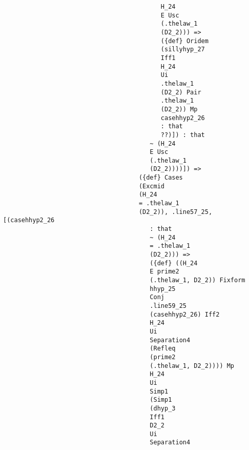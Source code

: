 \documentclass[12pt]{article}
\begin{document}
\begin{verbatim}
                                           H_24 
                                           E Usc 
                                           (.thelaw_1 
                                           (D2_2))) => 
                                           ({def} Oridem 
                                           (sillyhyp_27 
                                           Iff1 
                                           H_24 
                                           Ui 
                                           .thelaw_1 
                                           (D2_2) Pair 
                                           .thelaw_1 
                                           (D2_2)) Mp 
                                           casehhyp2_26 
                                           : that 
                                           ??)]) : that 
                                        ~ (H_24 
                                        E Usc 
                                        (.thelaw_1 
                                        (D2_2))))]) => 
                                     ({def} Cases 
                                     (Excmid 
                                     (H_24 
                                     = .thelaw_1 
                                     (D2_2)), .line57_25, [(casehhyp2_26 
                                        : that 
                                        ~ (H_24 
                                        = .thelaw_1 
                                        (D2_2))) => 
                                        ({def} ((H_24 
                                        E prime2 
                                        (.thelaw_1, D2_2)) Fixform 
                                        hhyp_25 
                                        Conj 
                                        .line59_25 
                                        (casehhyp2_26) Iff2 
                                        H_24 
                                        Ui 
                                        Separation4 
                                        (Refleq 
                                        (prime2 
                                        (.thelaw_1, D2_2)))) Mp 
                                        H_24 
                                        Ui 
                                        Simp1 
                                        (Simp1 
                                        (dhyp_3 
                                        Iff1 
                                        D2_2 
                                        Ui 
                                        Separation4 

\end{verbatim}
\end{document}
